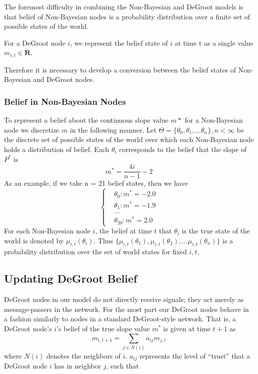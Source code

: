 \documentclass[a4paper,12pt]{article}
\begin{document}
The foremost difficulty in combining the Non-Bayesian and DeGroot models is that belief of Non-Bayesian nodes is a probability distribution over a finite set of possible states of the world.

For a DeGroot node $i$, we represent the belief state of $i$ at time t as a single value 
$m_{i,t} \in \mathbf{R}$.



Therefore it is necessary to develop a conversion between the belief states of Non-Bayesian and DeGroot nodes.


\subsubsection{Belief in Non-Bayesian Nodes}

To represent a belief about the continuous slope value $m*$ for a Non-Bayesian node we discretize $m$ in the following manner.  Let $\Theta = \{\theta_0, \theta_1,...\theta_n\}, n < \infty$ be the discrete set of possible states of the world over which each Non-Bayesian node holds a distribution of belief. Each $\theta_i$ corresponds to the belief that the slope of $P^*$ is
\begin{equation} \label{eq:theta_meaning}
m^* = \frac{4i}{n - 1} - 2
\end{equation}
As an example, if we take n = 21 belief states, then we have
\begin{equation}
\nonumber
\begin{cases}
& \theta_0: m^* = -2.0 \\
& \theta_1: m^* = -1.9 \\
& ... \\
& \theta_{20}: m^* = 2.0
\end{cases}
\end{equation}
For each Non-Bayesian node $i$, the belief at time $t$ that $\theta_i$ is the true state of the world is denoted by $\mu_{i,t}(\theta_i)$.  Thus $\{ \mu_{i,t}(\theta_1), \mu_{i,t}(\theta_2), ... \mu_{i,t}(\theta_n) \}$ is a probability distribution over the set of world states for fixed $i,t$.

\subsection{Updating DeGroot Belief}
DeGroot nodes in our model do not directly receive signals; they act merely as message-passers in the network.  For the most part our DeGroot nodes behave in a fashion similarly to nodes in a standard DeGroot-style network.  That is, a DeGroot node's $i$'s belief of the true slope value $m^*$ is given at time $t+1$ as
\begin{equation} \label{eq:degroot_update}
m_{i,t+1} = \sum_{j \in N(i)} a_{ij}m_{j,t}
\end{equation}
where $N(i)$ denotes the neighbors of $i$.  $a_{ij}$ represents the level of ``trust'' that a DeGroot node $i$ has in neighbor $j$, such that
\end{document}
